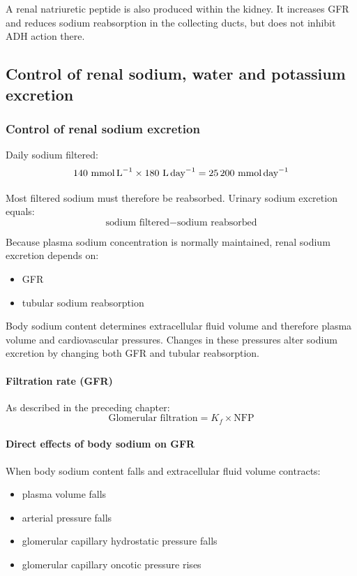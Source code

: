 \documentclass[11pt,a4paper]{article}
\begin{document}
A renal natriuretic peptide is also produced within the kidney. It increases GFR and reduces sodium reabsorption in the collecting ducts, but does not inhibit ADH action there.

\subsection{Control of renal sodium, water and potassium excretion}

\subsubsection{Control of renal sodium excretion}

Daily sodium filtered:
\[
140~\text{mmol\,L}^{-1} \times 180~\text{L\,day}^{-1} = 25\,200~\text{mmol\,day}^{-1}
\]

Most filtered sodium must therefore be reabsorbed. Urinary sodium excretion equals:
\[
\text{sodium filtered} - \text{sodium reabsorbed}
\]

Because plasma sodium concentration is normally maintained, renal sodium excretion depends on:
\begin{itemize}
    \item GFR
    \item tubular sodium reabsorption
\end{itemize}

Body sodium content determines extracellular fluid volume and therefore plasma volume and cardiovascular pressures. Changes in these pressures alter sodium excretion by changing both GFR and tubular reabsorption.

\paragraph{Filtration rate (GFR)}

As described in the preceding chapter:
\[
\text{Glomerular filtration} = K_f \times \text{NFP}
\]

\paragraph{Direct effects of body sodium on GFR}

When body sodium content falls and extracellular fluid volume contracts:
\begin{itemize}
    \item plasma volume falls
    \item arterial pressure falls
    \item glomerular capillary hydrostatic pressure falls
    \item glomerular capillary oncotic pressure rises
\end{itemize}
\end{document}
